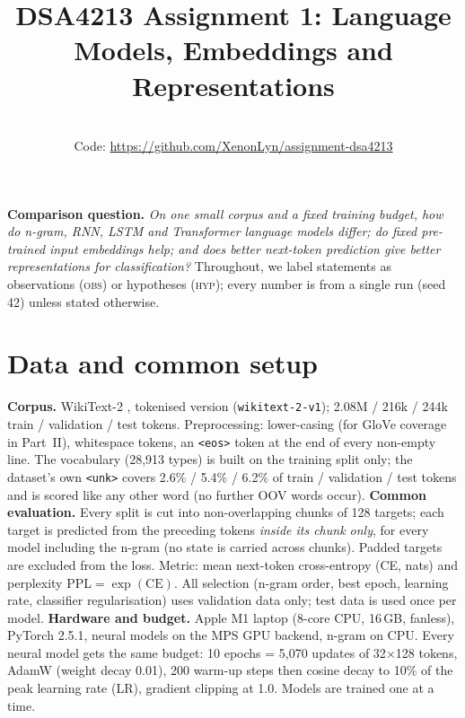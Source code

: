 \documentclass[10pt,a4paper]{article}
\title{\vspace{-1.2cm}\Large\textbf{DSA4213 Assignment 1: Language Models, Embeddings and Representations}}
\author{\reportauthor\\ \small Code: \url{https://github.com/XenonLyn/assignment-dsa4213}}
\date{\vspace{-0.6cm}}
\newcommand{\obs}{\textsc{obs}}
\newcommand{\hyp}{\textsc{hyp}}
\begin{document}
\maketitle

\noindent\textbf{Comparison question.} \emph{On one small corpus and a fixed training budget, how do
n-gram, RNN, LSTM and Transformer language models differ; do fixed pre-trained input embeddings help;
and does better next-token prediction give better representations for classification?}
Throughout, we label statements as observations (\obs) or hypotheses (\hyp); every number is from a
single run (seed 42) unless stated otherwise.

\section{Data and common setup}
\textbf{Corpus.} WikiText-2 \citep{merity2016}, tokenised version (\texttt{wikitext-2-v1}); 2.08M / 216k / 244k
train / validation / test tokens. Preprocessing: lower-casing (for GloVe coverage in Part~II), whitespace
tokens, an \texttt{<eos>} token at the end of every non-empty line. The vocabulary (28,913 types) is built
on the training split only; the dataset's own \texttt{<unk>} covers 2.6\% / 5.4\% / 6.2\% of train /
validation / test tokens and is scored like any other word (no further OOV words occur).
\textbf{Common evaluation.} Every split is cut into non-overlapping chunks of 128 targets; each target is
predicted from the preceding tokens \emph{inside its chunk only}, for every model including the n-gram
(no state is carried across chunks). Padded targets are excluded from the loss. Metric: mean next-token
cross-entropy (CE, nats) and perplexity PPL$=\exp(\text{CE})$. All selection (n-gram order, best epoch,
learning rate, classifier regularisation) uses validation data only; test data is used once per model.
\textbf{Hardware and budget.} Apple M1 laptop (8-core CPU, 16\,GB, fanless), PyTorch 2.5.1, neural models on
the MPS GPU backend, n-gram on CPU. Every neural model gets the same budget: 10 epochs = 5,070 updates of
32$\times$128 tokens, AdamW (weight decay 0.01), 200 warm-up steps then cosine decay to 10\% of the peak
learning rate (LR), gradient clipping at 1.0. Models are trained one at a time.
\end{document}
